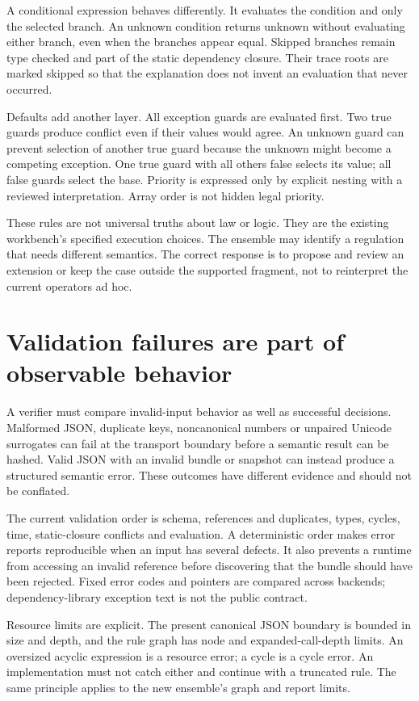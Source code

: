 \documentclass[12pt,a4paper,oneside,openany]{book}
\begin{document}
A conditional expression behaves differently. It evaluates the condition and
only the selected branch. An unknown condition returns unknown without evaluating
either branch, even when the branches appear equal. Skipped branches remain type
checked and part of the static dependency closure. Their trace roots are marked
skipped so that the explanation does not invent an evaluation that never occurred.

Defaults add another layer. All exception guards are evaluated first. Two true
guards produce conflict even if their values would agree. An unknown guard can
prevent selection of another true guard because the unknown might become a
competing exception. One true guard with all others false selects its value; all
false guards select the base. Priority is expressed only by explicit nesting with
a reviewed interpretation. Array order is not hidden legal priority.

These rules are not universal truths about law or logic. They are the existing
workbench's specified execution choices. The ensemble may identify a regulation
that needs different semantics. The correct response is to propose and review an
extension or keep the case outside the supported fragment, not to reinterpret
the current operators ad hoc.

\section{Validation failures are part of observable behavior}

A verifier must compare invalid-input behavior as well as successful decisions.
Malformed JSON, duplicate keys, noncanonical numbers or unpaired Unicode
surrogates can fail at the transport boundary before a semantic result can be
hashed. Valid JSON with an invalid bundle or snapshot can instead produce a
structured semantic error. These outcomes have different evidence and should
not be conflated.

The current validation order is schema, references and duplicates, types, cycles,
time, static-closure conflicts and evaluation. A deterministic order makes error
reports reproducible when an input has several defects. It also prevents a
runtime from accessing an invalid reference before discovering that the bundle
should have been rejected. Fixed error codes and pointers are compared across
backends; dependency-library exception text is not the public contract.

Resource limits are explicit. The present canonical JSON boundary is bounded in
size and depth, and the rule graph has node and expanded-call-depth limits. An
oversized acyclic expression is a resource error; a cycle is a cycle error. An
implementation must not catch either and continue with a truncated rule. The
same principle applies to the new ensemble's graph and report limits.
\end{document}
